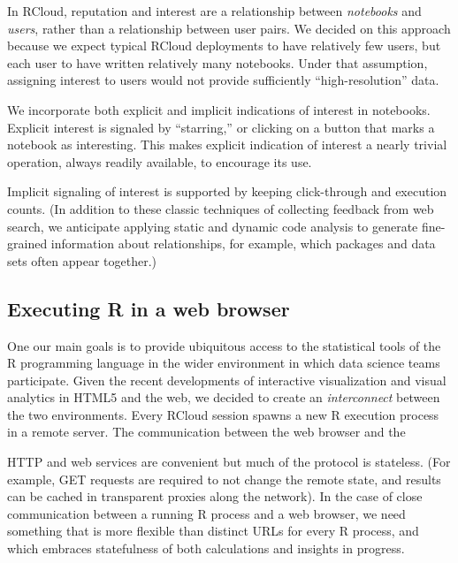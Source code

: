 In RCloud, reputation and interest are a relationship between
\emph{notebooks} and \emph{users}, rather than a relationship between
user pairs. We decided on this approach because we expect typical
RCloud deployments to have relatively few users, but each user to have
written relatively many notebooks. Under that assumption, assigning
interest to users would not provide sufficiently ``high-resolution'' data.

We incorporate both explicit and implicit indications of interest
in notebooks. Explicit interest is signaled by ``starring,'' or
clicking on a button that marks a notebook as interesting.
This makes explicit indication of interest a nearly trivial operation,
always readily available, to encourage its use.

Implicit signaling of interest is supported by keeping click-through
\cite{Joachims:2005:AIC} and execution counts. (In addition to these
classic techniques of collecting feedback from web search, we anticipate
applying static and dynamic code analysis to generate fine-grained
information about relationships, for example, which packages and data
sets often appear together.)

\subsection{Executing R in a web browser}

One our main goals is to provide ubiquitous access to the statistical
tools of the R programming language in the wider environment in which data
science teams participate.
%
Given the recent developments of interactive visualization and visual
analytics in HTML5 and the web, we decided to create an
\emph{interconnect} between the two environments.
%
Every RCloud session spawns a new R execution process in a remote
server. The communication between the web browser and the 


HTTP and web services are convenient but much of the protocol is
stateless. (For example, GET requests are required to not change the
remote state, and results can be cached in transparent proxies along
the network). In the case of close communication between a running
R process and a web browser, we need something that is more flexible
than distinct URLs for every R process, and which embraces
statefulness of both calculations and insights in progress.


